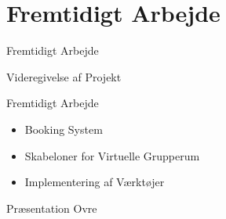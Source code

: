 \section*{Fremtidigt Arbejde}

\begin{frame}{Fremtidigt Arbejde}

Videregivelse af Projekt		
	
\end{frame}


\begin{frame}{Fremtidigt Arbejde}
	
	\begin{itemize}
		\item <1-> Booking System
		\item <2-> Skabeloner for Virtuelle Grupperum
		\item <3-> Implementering af V\ae{}rkt\o{}jer
	\end{itemize}
	 
\end{frame}

\begin{frame}{Pr\ae{}sentation Ovre}
	
	
\end{frame}